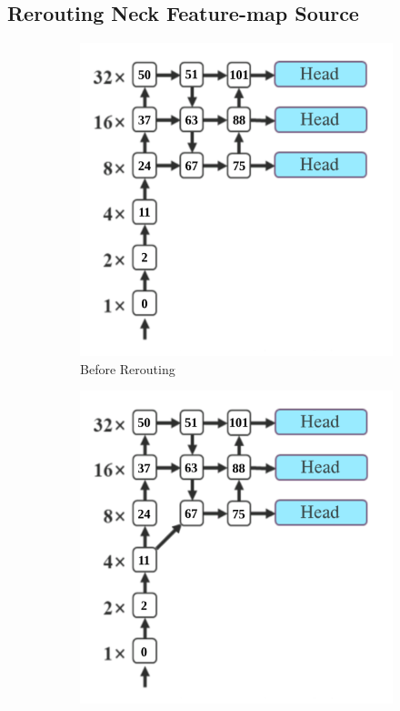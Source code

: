 \documentclass[conference]{IEEEtran}
\begin{document}
\subsection{Rerouting Neck Feature-map Source}
\begin{figure}[htbp]
  \begin{subfigure}[][][b]{0.5\linewidth}
    \includegraphics[width=1\linewidth]{../book/figures/deeperconn-before.png}
    \caption{Before Rerouting}
    \label{fig:deeperconn-before}
  \end{subfigure}\hfill%
  \begin{subfigure}[][][t]{0.5\linewidth}
    \includegraphics[width=1\linewidth]{../book/figures/deeperconn-after.png}

\end{subfigure}
\end{figure}
\end{document}
